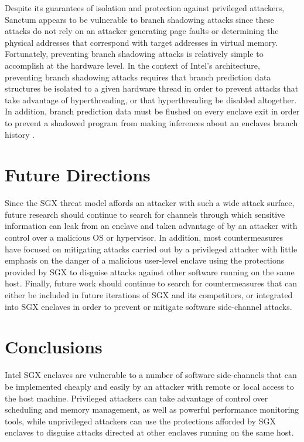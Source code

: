 Despite its guarantees of isolation and protection against privileged attackers, Sanctum appears to be vulnerable to branch shadowing attacks since these attacks do not rely on an attacker generating page faults or determining the physical addresses that correspond with target addresses in virtual memory. Fortunately, preventing branch shadowing attacks is relatively simple to accomplish at the hardware level. In the context of Intel's architecture, preventing branch shadowing attacks requires that branch prediction data structures be isolated to a given hardware thread in order to prevent attacks that take advantage of hyperthreading, or that hyperthreading be disabled altogether. In addition, branch prediction data must be flushed on every enclave exit in order to prevent a shadowed program from making inferences about an enclaves branch history \cite{costan_sanctum:_2016, costan_sanctum:_2015, lee_inferring_2017}.

\section{Future Directions}

Since the SGX threat model affords an attacker with such a wide attack surface, future research should continue to search for channels through which sensitive information can leak from an enclave and taken advantage of by an attacker with control over a malicious OS or hypervisor. In addition, most countermeasures have focused on mitigating attacks carried out by a privileged attacker with little emphasis on the danger of a malicious user-level enclave using the protections provided by SGX to disguise attacks against other software running on the same host. Finally, future work should continue to search for countermeasures that can either be included in future iterations of SGX and its competitors, or integrated into SGX enclaves in order to prevent or mitigate software side-channel attacks.

\section{Conclusions}

Intel SGX enclaves are vulnerable to a number of software side-channels that can be implemented cheaply and easily by an attacker with remote or local access to the host machine. Privileged attackers can take advantage of control over scheduling and memory management, as well as powerful performance monitoring tools, while unprivileged attackers can use the protections afforded by SGX enclaves to disguise attacks directed at other enclaves running on the same host. 

